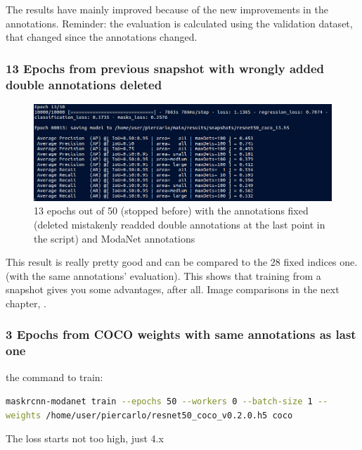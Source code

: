 The results have mainly improved because of the new improvements in the annotations. Reminder: the evaluation is calculated using the validation dataset, that changed since the annotations changed.

\subsubsection{13 Epochs from previous snapshot with wrongly added double annotations deleted}

\begin{figure}[H]
	\centering
	\includegraphics[width=\linewidth]{figures/train/13afterafternewannotations}
	\caption{13 epochs out of 50 (stopped before) with the annotations fixed (deleted mistakenly readded double annotations at the last point in the script) and ModaNet annotations}
	\label{f:train-13afterafternewannotations}
\end{figure}

This result is really pretty good and can be compared to the 28 fixed indices one. (with the same annotations' evaluation). This shows that training from a snapshot gives you some advantages, after all. Image comparisons in the next chapter, .

\subsubsection{3 Epochs from COCO weights with same annotations as last one}

the command to train:

\lstinline[language=bash, breaklines=true]|maskrcnn-modanet train --epochs 50 --workers 0 --batch-size 1 --weights /home/user/piercarlo/resnet50_coco_v0.2.0.h5 coco|

The loss starts not too high, just 4.x

